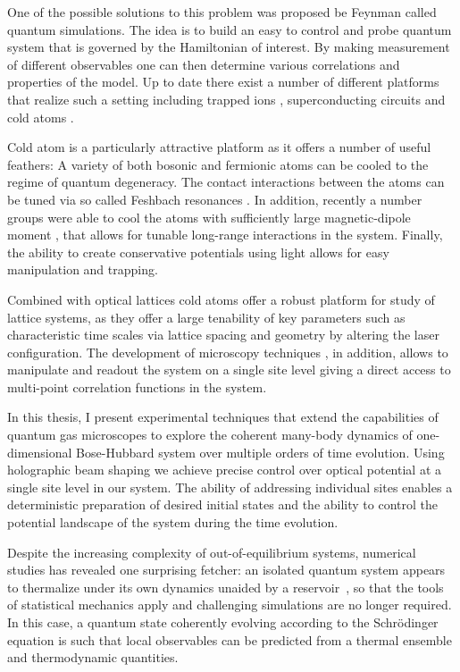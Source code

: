 One of the possible solutions to this problem was proposed be Feynman \cite{nt. J. Theor. Phys. 21,467 (1982)} called quantum simulations. The idea is to build an easy to control and probe quantum system that is governed by the Hamiltonian of interest. By making measurement of different observables one can then determine various correlations and properties of the model. Up to date there exist a number of different platforms that realize such a setting including trapped ions \cite{Nature Phys.8, 277 (2012)}, superconducting circuits \cite{Nature Phys. 8, 292 (2012)} and cold atoms \cite{Nature Phys. 8, 267 (2012)}.

Cold atom is a particularly attractive platform as it offers a number of useful feathers: A variety of both bosonic  and fermionic atoms can be cooled to the regime of quantum degeneracy. The contact interactions between the atoms can be tuned via so called Feshbach resonances \cite{Rev. Mod. Phys., 82:1225, 2010}. In addition, recently a number groups were able to cool the atoms with sufficiently large magnetic-dipole moment \cite{disprosium erbium}, that allows for tunable long-range interactions in the system. Finally, the ability to create conservative potentials using light allows for easy manipulation and trapping.  

Combined with optical lattices cold atoms offer a robust platform for study of lattice systems, as they offer a large tenability of key parameters such as characteristic time scales via lattice spacing and geometry by altering the laser configuration. The development of microscopy techniques \cite{QGM, Nature 467, 68 (2010), shtefan kure}, in addition, allows to manipulate and readout the system on a single site level giving a direct access to multi-point correlation functions in the system.

In this thesis, I present experimental techniques that extend the capabilities of quantum gas microscopes to explore the coherent many-body dynamics of one-dimensional Bose-Hubbard system over multiple orders of time evolution. Using holographic beam shaping we achieve precise control over optical potential at a single site level in our system. The ability of addressing individual sites enables a deterministic preparation of desired initial states and the ability to control the potential landscape of the system during the time evolution.

Despite the increasing complexity of out-of-equilibrium systems, numerical studies has revealed one surprising fetcher: an isolated quantum system appears to thermalize under its own dynamics unaided by a reservoir~\cite{Deutsch1991, Olshanii2008,Eisert2015}, so that the tools of statistical mechanics apply and challenging simulations are no longer required. In this case, a quantum state coherently evolving according to the Schr\"{o}dinger equation is such that local observables can be predicted from a thermal ensemble and thermodynamic quantities. 

